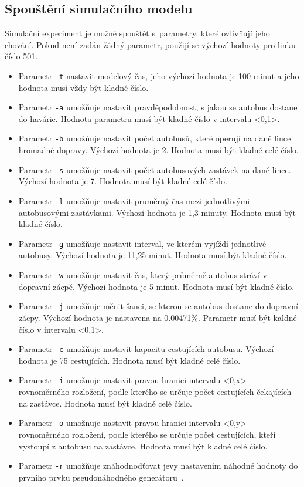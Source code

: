 \documentclass[a4paper]{article}
\begin{document}
        \subsection{Spouštění simulačního modelu}
        \label{subsec:start}

            Simulační experiment je možné spouštět s~parametry, které ovlivňují jeho chování. Pokud není zadán žádný parametr, použijí se výchozí hodnoty pro linku číslo 501.
            
            \begin{itemize}
                \item Parametr \texttt{-t}  nastavit modelový čas, jeho výchozí hodnota je 100 minut a jeho hodnota musí vždy být kladné číslo.
                \item Parametr \texttt{-a} umožňuje nastavit pravděpodobnost, s jakou se autobus dostane do havárie. Hodnota parametru musí být kladné číslo v intervalu <0,1>.
                \item Parametr \texttt{-b} umožňuje nastavit počet autobusů, které operují na dané lince hromadné dopravy. Výchozí hodnota je 2. Hodnota musí být kladné celé číslo.
                \item Parametr \texttt{-s} umožňuje nastavit počet autobusových zastávek na dané lince. Výchozí hodnota je 7. Hodnota musí být kladné celé číslo.
                \item Parametr \texttt{-l} umožňuje nastavit pruměrný čas mezi jednotlivými autobusovými zastávkami. Výchozí hodnota je 1,3 minuty. Hodnota musí být kladné číslo.
                \item Parametr \texttt{-g} umožňuje nastavit interval, ve kterém vyjíždí jednotlivé autobusy. Výchozí hodnota je 11,25 minut. Hodnota musí být kladné číslo.
                \item Parametr \texttt{-w} umožňuje nastavit čas, který průměrně autobus stráví v dopravní zácpě. Výchozí hodnota je 5 minut. Hodnota musí být kladné číslo.
                \item Parametr \texttt{-j} umožňuje měnit šanci, se kterou se autobus dostane do dopravní zácpy. Výchozí hodnota je nastavena na 0.00471\%. Parametr musí být kaldné číslo v intervalu <0,1>.
                \item Parametr \texttt{-c} umožňuje nastavit kapacitu cestujících autobusu. Výchozí hodnota je 75 cestujících. Hodnota musí být kladné  celé číslo.
            
            \item Parametr \texttt{-i} umožnuje nastavit pravou hranici intervalu <0,x> rovnoměrného rozložení, podle kterého se určuje počet cestujících čekajících na zastávce. Hodnota musí být kladné celé číslo.
            \item Parametr \texttt{-o} umožnuje nastavit pravou hranici intervalu <0,y> rovnoměrného rozložení, podle kterého se určuje počet cestujících, kteří vystoupí z autobusu na zastávce. Hodnota musí být kladné celé číslo.
            \item Parametr \texttt{-r} umožňuje znáhodnodťovat jevy nastavením náhodné hodnoty do prvního prvku pseudonáhodného generátoru~\cite[snímek 72]{IMS_slides}. 
            \end{itemize}
\end{document}
